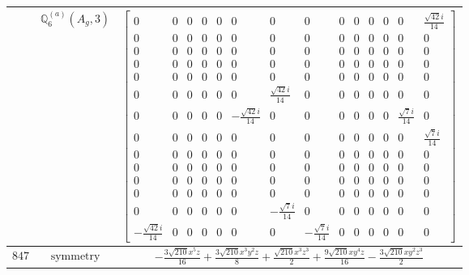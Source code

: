 \documentclass[fleqn,8pt,landscape]{jsarticle}
\begin{document}
\begin{longtable}{ccc}
$  $ & $ \mathbb{Q}_{6}^{(a)}(A_{g},3) $ & $ \begin{bmatrix} 0 & 0 & 0 & 0 & 0 & 0 & 0 & 0 & 0 & 0 & 0 & 0 & 0 & \frac{\sqrt{42} i}{14} \\ 0 & 0 & 0 & 0 & 0 & 0 & 0 & 0 & 0 & 0 & 0 & 0 & 0 & 0 \\ 0 & 0 & 0 & 0 & 0 & 0 & 0 & 0 & 0 & 0 & 0 & 0 & 0 & 0 \\ 0 & 0 & 0 & 0 & 0 & 0 & 0 & 0 & 0 & 0 & 0 & 0 & 0 & 0 \\ 0 & 0 & 0 & 0 & 0 & 0 & 0 & 0 & 0 & 0 & 0 & 0 & 0 & 0 \\ 0 & 0 & 0 & 0 & 0 & 0 & \frac{\sqrt{42} i}{14} & 0 & 0 & 0 & 0 & 0 & 0 & 0 \\ 0 & 0 & 0 & 0 & 0 & - \frac{\sqrt{42} i}{14} & 0 & 0 & 0 & 0 & 0 & 0 & \frac{\sqrt{7} i}{14} & 0 \\ 0 & 0 & 0 & 0 & 0 & 0 & 0 & 0 & 0 & 0 & 0 & 0 & 0 & \frac{\sqrt{7} i}{14} \\ 0 & 0 & 0 & 0 & 0 & 0 & 0 & 0 & 0 & 0 & 0 & 0 & 0 & 0 \\ 0 & 0 & 0 & 0 & 0 & 0 & 0 & 0 & 0 & 0 & 0 & 0 & 0 & 0 \\ 0 & 0 & 0 & 0 & 0 & 0 & 0 & 0 & 0 & 0 & 0 & 0 & 0 & 0 \\ 0 & 0 & 0 & 0 & 0 & 0 & 0 & 0 & 0 & 0 & 0 & 0 & 0 & 0 \\ 0 & 0 & 0 & 0 & 0 & 0 & - \frac{\sqrt{7} i}{14} & 0 & 0 & 0 & 0 & 0 & 0 & 0 \\ - \frac{\sqrt{42} i}{14} & 0 & 0 & 0 & 0 & 0 & 0 & - \frac{\sqrt{7} i}{14} & 0 & 0 & 0 & 0 & 0 & 0 \end{bmatrix} $ \\ \hline
$ 847 $ & $ \text{symmetry} $ & $ - \frac{3 \sqrt{210} x^{5} z}{16} + \frac{3 \sqrt{210} x^{3} y^{2} z}{8} + \frac{\sqrt{210} x^{3} z^{3}}{2} + \frac{9 \sqrt{210} x y^{4} z}{16} - \frac{3 \sqrt{210} x y^{2} z^{3}}{2} $ \\

\end{longtable}
\end{document}

